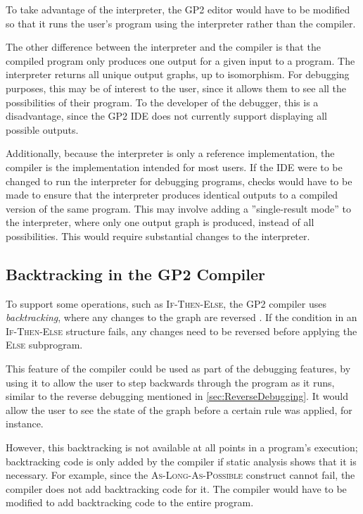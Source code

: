 \documentclass[authoryearcitations]{UoYCSproject}
\begin{document}
To take advantage of the interpreter, the GP2 editor would have to be modified
so that it runs the user's program using the interpreter rather than the compiler.

The other difference between the interpreter and the compiler is that the compiled
program only produces one output for a given input to a program. The interpreter
returns all unique output graphs, up to isomorphism. For debugging purposes, this
may be of interest to the user, since it allows them to see all the possibilities
of their program. To the developer of the debugger, this is a disadvantage, since
the GP2 IDE does not currently support displaying all possible outputs.

Additionally, because the interpreter is only a reference implementation, the
compiler is the implementation intended for most users. If the IDE were to be
changed to run the interpreter for debugging programs, checks would have to be
made to ensure that the interpreter produces identical outputs to a compiled
version of the same program. This may involve adding a ''single-result mode'' to
the interpreter, where only one output graph is produced, instead of all
possibilities. This would require substantial changes to the interpreter.


\subsection{Backtracking in the GP2 Compiler}
\label{sec:BacktrackingInTheGP2Compiler}

To support some operations, such as \textsc{If-Then-Else}, the GP2 compiler uses
\emph{backtracking}, where any changes to the graph are reversed \citep[ch. 5.8]{bak2015}.
If the condition in an \textsc{If-Then-Else} structure fails, any changes need
to be reversed before applying the \textsc{Else} subprogram.

This feature of the compiler could be used as part of the debugging features,
by using it to allow the user to step backwards through the program as it runs,
similar to the reverse debugging mentioned in \autoref{sec:ReverseDebugging}. It
would allow the user to see the state of the graph before a certain rule was
applied, for instance.

However, this backtracking is not available at all points in a program's
execution; backtracking code is only added by the compiler if static analysis
shows that it is necessary. For example, since the \textsc{As-Long-As-Possible}
construct cannot fail, the compiler does not add backtracking code for it. The
compiler would have to be modified to add backtracking code to the entire
program.
\end{document}

